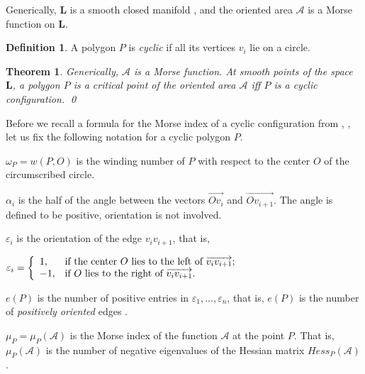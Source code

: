 \documentclass[12pt]{amsart}
\theoremstyle{plain}
\newtheorem{theorem}{Theorem}
\theoremstyle{definition}
\newtheorem{definition}{Definition}
\theoremstyle{remark}
\theoremstyle{plain}
\theoremstyle{definition}
\begin{document}
Generically, $\mathbf{L}$ is a smooth closed manifold  \cite{Farber, MilKap}, and
 the oriented area $\mathcal{A}$  is a  Morse function on $\mathbf{L}$.




\begin{definition}
    A
polygon  $P$  is  \textit{cyclic} if all its vertices $v_i$
lie on a circle.

\end{definition}



\begin{theorem}\label{Thm_crirical_are_cyclic}\cite{khipan}  Generically, $\mathcal{A}$ is a Morse function.
 At smooth points of the space  $\mathbf{L}$, a polygon $P$ is a critical point of the
oriented area  $\mathcal{A}$  iff $P$ is a cyclic configuration.
        \qed
\end{theorem}


Before we recall a formula for the Morse index of a cyclic configuration from \cite{zhu}, \cite{khipan1},
let us fix the following notation for a cyclic polygon $P$.

$\omega_P=w(P,O)$ is the winding number of $P$ with respect to the center $O$ of the circumscribed circle.

$\alpha_i$  is the half of the angle between the vectors
$\overrightarrow{Ov_i}$ and $\overrightarrow{Ov_{i+1}}$. The angle
is defined to be positive, orientation is not involved.




$\varepsilon_i$ is the
orientation of the edge $v_iv_{i+1}$, that is,

 $\varepsilon_i=\left\{
                       \begin{array}{ll}
                         1, & \hbox{if the center $O$ lies to the left of } \overrightarrow{v_iv_{i+1}};\\
                         -1, & \hbox{if  $O$ lies to the right of } \overrightarrow{v_iv_{i+1}}.
                       \end{array}
                     \right.$



$e(P)$ is the number of positive entries in $\varepsilon_1,...,\varepsilon_n$, that is, $e(P)$ is the number of \textit{positively oriented }edges .



$\mu_P=\mu_P(\mathcal{A})$ is the Morse index of the function $\mathcal{A}$ at the point
$P$. That is, $\mu_P(\mathcal{A})$ is the number of negative eigenvalues of the
Hessian matrix $Hess_P(\mathcal{A})$.
\end{document}
